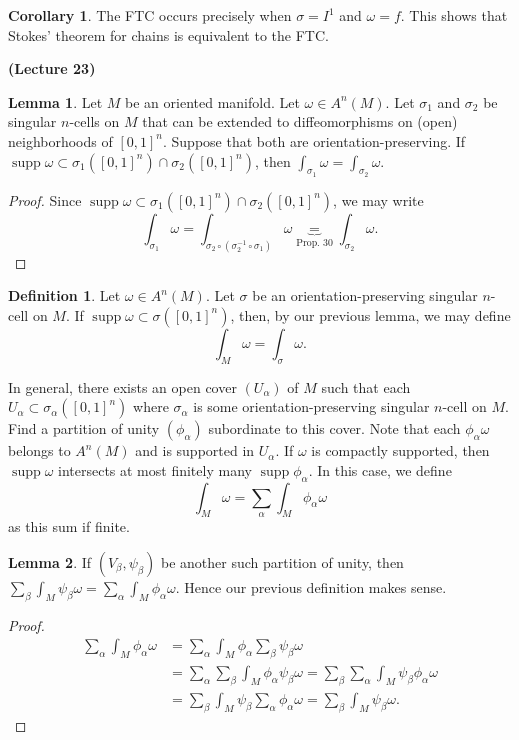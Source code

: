 \documentclass[10pt,letterpaper,cm]{nupset}
\theoremstyle{definition}
\newtheorem*{definition}{Definition}
\newtheorem{corollary}{Corollary}
\newtheorem{lemma}{Lemma}
\newcommand{\1}{\mathbf{1}}
\newcommand{\0}{\vec 0}
\DeclareMathOperator{\supp}{supp}
\begin{document}
\begin{corollary}
The FTC occurs precisely when $\sigma = I^1$ and $\omega = f$. This shows that Stokes' theorem for chains is equivalent to the FTC.
\end{corollary}

\begin{center}
{\textbf{(Lecture 23)}} 
\end{center}

\begin{lemma}
Let $M$ be an oriented manifold. Let $\omega \in A^n(M)$. Let $\sigma_1$ and $\sigma_2$ be singular $n$-cells on $M$ that can be extended to diffeomorphisms on (open) neighborhoods of $[0,1]^n$. Suppose that both are orientation-preserving. If $\supp \omega \subset  \sigma_1([0,1]^n) \cap \sigma_2([0,1]^n)$, then $\int_{\sigma_1} \omega = \int_{\sigma_2} \omega$.
\end{lemma}
\begin{proof}
Since $\supp \omega \subset  \sigma_1([0,1]^n) \cap \sigma_2([0,1]^n)$, we may write $$\int_{\sigma_1} \omega = \int_{\sigma_2 \circ (\sigma_2^{-1} \circ \sigma_1)} \omega  \underbrace{=}_{\text{Prop. 30}} \int_{\sigma_2} \omega     .$$
\end{proof}

\begin{definition}
Let $\omega \in A^n(M)$. Let $\sigma$ be an orientation-preserving singular $n$-cell on $M$. If $\supp \omega \subset \sigma([0,1]^n)$, then, by our previous lemma, we may define $$\int_M \omega = \int_{\sigma} \omega.$$

In general, there exists an open cover $(U_{\alpha})$ of $M$ such that each $U_{\alpha} \subset \sigma_{\alpha}([0,1]^n)$ where $\sigma_{\alpha}$ is some orientation-preserving singular $n$-cell on $M$. Find a partition of unity $(\phi_{\alpha})$ subordinate to this cover. Note that each $\phi_{\alpha} \omega$ belongs to  $A^n(M)$ and is supported in $U_{\alpha}$. If $\omega$ is compactly supported, then $\supp \omega$ intersects at most finitely many $\supp \phi_{\alpha}$. In this case, we define $$\int_M \omega = \sum_{\alpha}  \int_M \phi_{\alpha} \omega$$ as this sum if finite. 
\end{definition}

\begin{lemma}
If $(V_{\beta}, \psi_{\beta})$ be another such partition of unity, then $\sum_{\beta}\int_M\psi_{\beta} \omega = \sum_{\alpha}  \int_M \phi_{\alpha} \omega$. Hence our previous definition makes sense.
\end{lemma}
\begin{proof}
\begin{align*}
 \sum_{\alpha}  \int_M \phi_{\alpha} \omega
& =  \sum_{\alpha}  \int_M \phi_{\alpha} \sum_{\beta} \psi_{\beta} \omega
\\ & = \sum_{\alpha} \sum_{\beta} \int_M \phi_{\alpha} \psi_{\beta} \omega
 = \sum_{\beta} \sum_{\alpha} \int_M \psi_{\beta} \phi_{\alpha} \omega
\\ & = \sum_{\beta}  \int_M \psi_{\beta} \sum_{\alpha} \phi_{\alpha} \omega
 = \sum_{\beta}\int_M\psi_{\beta} \omega. 
\end{align*}
\end{proof}
\end{document}

